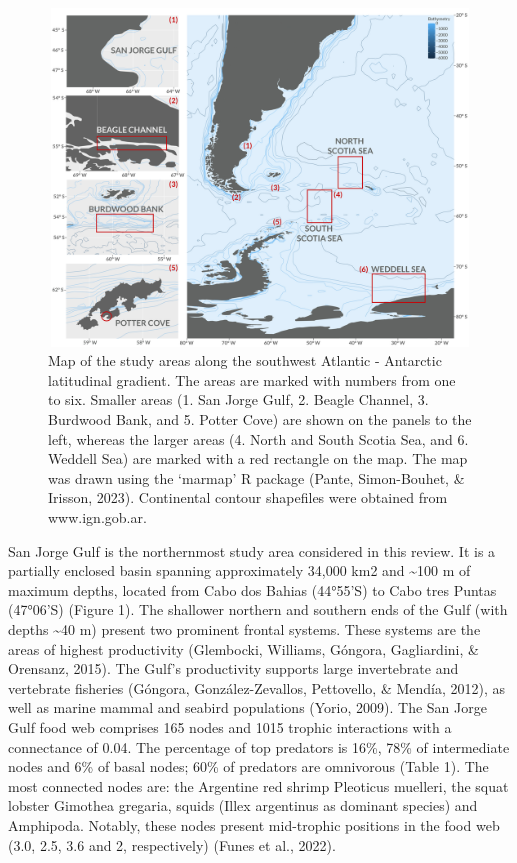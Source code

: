 \documentclass[
]{article}
\begin{document}
\begin{figure}
\centering
\includegraphics[width=6.27in,height=3.528in]{Figures/Map_final.jpg}
\caption{Map of the study areas along the southwest Atlantic - Antarctic
latitudinal gradient. The areas are marked with numbers from one to six.
Smaller areas (1. San Jorge Gulf, 2. Beagle Channel, 3. Burdwood Bank,
and 5. Potter Cove) are shown on the panels to the left, whereas the
larger areas (4. North and South Scotia Sea, and 6. Weddell Sea) are
marked with a red rectangle on the map. The map was drawn using the
`marmap' R package (Pante, Simon-Bouhet, \& Irisson, 2023). Continental
contour shapefiles were obtained from www.ign.gob.ar.}
\end{figure}

San Jorge Gulf is the northernmost study area considered in this review.
It is a partially enclosed basin spanning approximately 34,000 km2 and
\textasciitilde100 m of maximum depths, located from Cabo dos Bahias
(44°55'S) to Cabo tres Puntas (47°06'S) (Figure 1). The shallower
northern and southern ends of the Gulf (with depths \textasciitilde40 m)
present two prominent frontal systems. These systems are the areas of
highest productivity (Glembocki, Williams, Góngora, Gagliardini, \&
Orensanz, 2015). The Gulf's productivity supports large invertebrate and
vertebrate fisheries (Góngora, González-Zevallos, Pettovello, \& Mendía,
2012), as well as marine mammal and seabird populations (Yorio, 2009).
The San Jorge Gulf food web comprises 165 nodes and 1015 trophic
interactions with a connectance of 0.04. The percentage of top predators
is 16\%, 78\% of intermediate nodes and 6\% of basal nodes; 60\% of
predators are omnivorous (Table 1). The most connected nodes are: the
Argentine red shrimp Pleoticus muelleri, the squat lobster Gimothea
gregaria, squids (Illex argentinus as dominant species) and Amphipoda.
Notably, these nodes present mid-trophic positions in the food web (3.0,
2.5, 3.6 and 2, respectively) (Funes et al., 2022).
\end{document}
